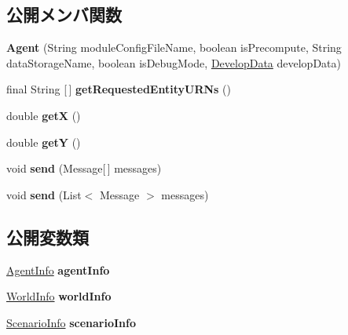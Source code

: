 \subsection*{公開メンバ関数}
\begin{DoxyCompactItemize}
\item 
\hypertarget{classadf_1_1agent_1_1Agent_ababeb55c6e8dd72407db4f392b1d25e9}{}\label{classadf_1_1agent_1_1Agent_ababeb55c6e8dd72407db4f392b1d25e9} 
{\bfseries Agent} (String module\+Config\+File\+Name, boolean is\+Precompute, String data\+Storage\+Name, boolean is\+Debug\+Mode, \hyperlink{classadf_1_1agent_1_1develop_1_1DevelopData}{Develop\+Data} develop\+Data)
\item 
\hypertarget{classadf_1_1agent_1_1Agent_a39ccb85e5b206e0e521fb20d865cbefd}{}\label{classadf_1_1agent_1_1Agent_a39ccb85e5b206e0e521fb20d865cbefd} 
final String \mbox{[}$\,$\mbox{]} {\bfseries get\+Requested\+Entity\+U\+R\+Ns} ()
\item 
\hypertarget{classadf_1_1agent_1_1Agent_a09eb35626bb940da8a0b5d48ea098682}{}\label{classadf_1_1agent_1_1Agent_a09eb35626bb940da8a0b5d48ea098682} 
double {\bfseries getX} ()
\item 
\hypertarget{classadf_1_1agent_1_1Agent_a5161c268c9a7dd0382db84b7592c08f6}{}\label{classadf_1_1agent_1_1Agent_a5161c268c9a7dd0382db84b7592c08f6} 
double {\bfseries getY} ()
\item 
\hypertarget{classadf_1_1agent_1_1Agent_ac1c04c3453252af7754dff684091fdc3}{}\label{classadf_1_1agent_1_1Agent_ac1c04c3453252af7754dff684091fdc3} 
void {\bfseries send} (Message\mbox{[}$\,$\mbox{]} messages)
\item 
\hypertarget{classadf_1_1agent_1_1Agent_a4b7a389a5f8c0ae1dc60e7831de59833}{}\label{classadf_1_1agent_1_1Agent_a4b7a389a5f8c0ae1dc60e7831de59833} 
void {\bfseries send} (List$<$ Message $>$ messages)
\end{DoxyCompactItemize}
\subsection*{公開変数類}
\begin{DoxyCompactItemize}
\item 
\hypertarget{classadf_1_1agent_1_1Agent_aa547b5cd18770b2e9bc7460eea8f03a3}{}\label{classadf_1_1agent_1_1Agent_aa547b5cd18770b2e9bc7460eea8f03a3} 
\hyperlink{classadf_1_1agent_1_1info_1_1AgentInfo}{Agent\+Info} {\bfseries agent\+Info}
\item 
\hypertarget{classadf_1_1agent_1_1Agent_a5c9c233f23eec057d6e6e415d3dc77f5}{}\label{classadf_1_1agent_1_1Agent_a5c9c233f23eec057d6e6e415d3dc77f5} 
\hyperlink{classadf_1_1agent_1_1info_1_1WorldInfo}{World\+Info} {\bfseries world\+Info}
\item 
\hypertarget{classadf_1_1agent_1_1Agent_ac2e2e8cad945673ee941e29251bddfcb}{}\label{classadf_1_1agent_1_1Agent_ac2e2e8cad945673ee941e29251bddfcb} 
\hyperlink{classadf_1_1agent_1_1info_1_1ScenarioInfo}{Scenario\+Info} {\bfseries scenario\+Info}
\end{DoxyCompactItemize}
